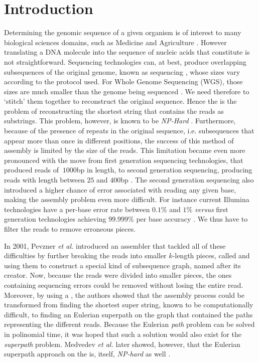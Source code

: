 \chapter{Introduction}

Determining the genomic sequence of a given organism is of interest to many biological sciences domains, such as Medicine and Agriculture \cite{Lohmann2014, Imelfort2009}. However translating a DNA molecule into the sequence of nucleic acids that constitute is not straightforward. Sequencing technologies can, at best, produce overlapping subsequences of the original genome, known as sequencing , whose sizes vary according to the protocol used. For Whole Genome Sequencing (WGS), those sizes are much smaller than the genome being sequenced \cite{Miller2010}. We need therefore to `stitch' them together to reconstruct the original sequence. Hence the  is the problem of reconstructing the shortest string that contains the reads as substrings. This problem, however, is known to be \emph{NP-Hard} \cite{Gallant1980}. Furthermore, because of the presence of repeats in the original sequence, i.e. subsequences that appear more than once in different positions, the success of this method of assembly is limited by the size of the reads. This limitation became even more pronounced with the move from first generation sequencing technologies, that produced reads of $~1000$bp in length, to second generation sequencing, producing reads with length between $25$ and $400$bp \cite{Shendure2008}. The second generation sequencing also introduced a higher chance of error associated with reading any given base, making the assembly problem even more difficult. For instance current Illumina technologies have a per-base error rate between $0.1\%$ and $1\%$ \cite{Metzker2010} \emph{versus} first generation technologies achieving $99.999\%$ per base accuracy \cite{Shendure2008}. We thus have to filter the reads to remove erroneous pieces.

In 2001, Pevzner \emph{et al.} \cite{Pevzner2001} introduced an assembler that tackled all of these difficulties by further breaking the reads into smaller $k$-length pieces, called  and using them to construct a special kind of subsequence graph, named \keyterm{\dBG} after its creator. Now, because the reads were divided into smaller pieces, the ones containing sequencing errors could be removed without losing the entire read. Moreover, by using a \dBG, the authors showed that the assembly process could be transformed from finding the shortest super string, known to be computationally difficult, to finding an Eulerian superpath on the graph that contained the paths representing the different reads. Because the Eulerian \emph{path} problem can be solved in polinomial time, it was hoped that such a solution would also exist for the \emph{superpath} problem. Medvedev \emph{et al.} later showed, however, that the Eulerian superpath approach on the \dBG is, itself, \emph{NP-hard} as well \cite{Medvedev2007}.

